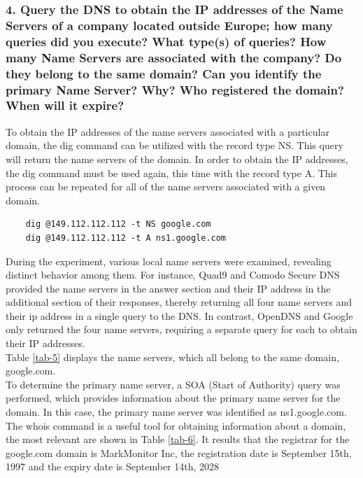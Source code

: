 \documentclass[eng]{class}
\begin{document}
\subsubsection*{4. Query the DNS to obtain the IP addresses of the Name Servers of a company
    located outside Europe; how many queries did you execute? What type(s) of
    queries? How many Name Servers are associated with the company? Do they
    belong to the same domain? Can you identify the primary Name Server? Why?
    Who registered the domain? When will it expire?}
To obtain the IP addresses of the name servers associated with a particular domain, the dig command can be utilized with the record type NS.
This query will return the name servers of the domain.
In order to obtain the IP addresses, the dig command must be used again, this time with the record type A.
This process can be repeated for all of the name servers associated with a given domain.
\begin{lstlisting}
    dig @149.112.112.112 -t NS google.com
    dig @149.112.112.112 -t A ns1.google.com
\end{lstlisting}
During the experiment, various local name servers were examined, revealing distinct behavior among them.
For instance, Quad9 and Comodo Secure DNS provided the name servers in the answer section and their IP address in the additional section of their responses,
thereby returning all four name servers and their ip address in a single query to the DNS.
In contrast, OpenDNS and Google only returned the four name servers, requiring a separate query for each to obtain their IP addresses.\\
Table \ref*{tab-5} displays the name servers, which all belong to the same domain, google.com.\\
To determine the primary name server, a SOA (Start of Authority) query was performed,
which provides information about the primary name server for the domain.
In this case, the primary name server was identified as ns1.google.com.\\
\noindent
The whois command is a useful tool for obtaining information about a domain, the most relevant are shown in Table \ref{tab-6}.
It results that the registrar for the  google.com domain is MarkMonitor Inc, the registration date is September 15th, 1997 and the expiry date is September 14th, 2028
\end{document}
